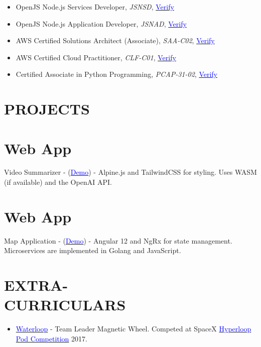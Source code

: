 \documentclass[margin]{res}
\begin{document}
\begin{resume}
\begin{itemize}
		\item OpenJS Node.js Services Developer, \textit{JSNSD},
					\href{https://www.youracclaim.com/badges/d17570bd-2145-4cc2-9645-673fc3f6947e}{\textcolor{blue}{Verify}}

		\item OpenJS Node.js Application Developer, \textit{JSNAD},
		      \href{https://www.youracclaim.com/badges/76bcd62c-af5b-4957-b9ef-533403369d8d}{\textcolor{blue}{Verify}}

		\item AWS Certified Solutions Architect (Associate), \textit{SAA-C02},
		      \href{https://www.youracclaim.com/badges/4b572dd0-85e9-45f5-90f8-90a68cd3399f}{\textcolor{blue}{Verify}}

		\item AWS Certified Cloud Practitioner, \textit{CLF-C01},
		      \href{https://www.youracclaim.com/badges/48063b2f-6f7f-4b6c-a040-5c42393c4bc0}{\textcolor{blue}{Verify}}


		\item Certified Associate in Python Programming, \textit{PCAP-31-02},
		      \href{https://www.youracclaim.com/badges/bfd6aae6-1ab4-461b-8a62-f25cfb0bd29d}{\textcolor{blue}{Verify}}

	\end{itemize}

	\section{\textcolor{NavyBlue}{PROJECTS}}
	\normalsize{\section{Web App}}
	Video Summarizer - (\href{https://video-summarizer.pages.dev/}{\textcolor{blue}{Demo}}) - Alpine.js and TailwindCSS
	for styling. Uses WASM (if available) and the OpenAI API.
	\normalsize{\section{Web App}}
	Map Application - (\href{https://tripsultant.com}{\textcolor{blue}{Demo}}) - Angular 12 and NgRx
	for state management. Microservices are implemented in Golang and JavaScript.

	\section{\textcolor{NavyBlue}{EXTRA- \\ CURRICULARS}}
	\begin{itemize} \itemsep -2pt %
		\item \href{https://teamwaterloop.ca/}{\textcolor{blue}{Waterloop}} - Team Leader Magnetic Wheel. Competed at SpaceX \href{https://en.wikipedia.org/wiki/Hyperloop_pod_competition}{\textcolor{blue}{Hyperloop Pod Competition}} 2017.
	\end{itemize}


\end{resume}
\end{document}
